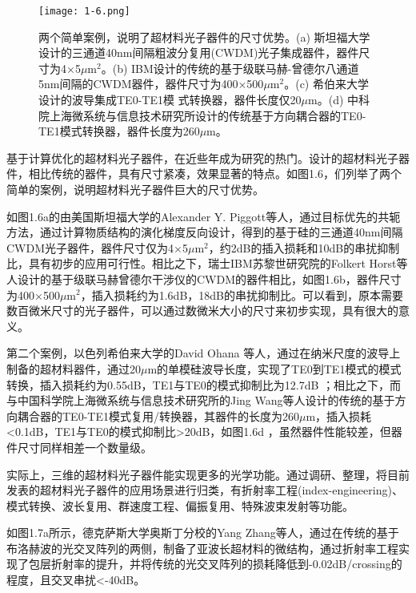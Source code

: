 \begin{figure}[!htbp]
    \centering
    \texttt{[image: 1-6.png]}
    \caption{两个简单案例，说明了超材料光子器件的尺寸优势。(a) 斯坦福大学设计的三通道40nm间隔粗波分复用(CWDM)光子集成器件，器件尺寸为4×5$\mu$m$^2$。(b) IBM设计的传统的基于级联马赫-曾德尔八通道5nm间隔的CWDM器件，器件尺寸为400×500$\mu$m$^2$。(c) 希伯来大学设计的波导集成TE0-TE1模 式转换器，器件长度仅20$\mu$m。(d) 中科院上海微系统与信息技术研究所设计的传统基于方向耦合器的TE0-TE1模式转换器，器件长度为260$\mu$m。\cite{Su2017Inverse,Folkert2013Cascaded,Ohana2016Dielectric,Jing2015Broadband}}
    \label{fig:1-6}
\end{figure}

基于计算优化的超材料光子器件，在近些年成为研究的热门。设计的超材料光子器件，相比传统的器件，具有尺寸紧凑，效果显著的特点。如图1.6，们列举了两个简单的案例，说明超材料光子器件巨大的尺寸优势。

如图1.6a的由美国斯坦福大学的Alexander Y. Piggott等人，通过目标优先的共轭方法，通过计算物质结构的演化梯度反向设计，得到的基于硅的三通道40nm间隔CWDM光子器件，器件尺寸仅为4×5$\mu$m$^2$，约2dB的插入损耗和10dB的串扰抑制比，具有初步的应用可行性\cite{Su2017Inverse}。相比之下，瑞士IBM苏黎世研究院的Folkert Horst等人设计的基于级联马赫曾德尔干涉仪的CWDM的器件相比，如图1.6b，器件尺寸为400×500$\mu$m$^2$，插入损耗约为1.6dB，18dB的串扰抑制比\cite{Folkert2013Cascaded}。可以看到，原本需要数百微米尺寸的光子器件，可以通过数微米大小的尺寸来初步实现，具有很大的意义。

第二个案例，以色列希伯来大学的David Ohana 等人，通过在纳米尺度的波导上制备的超材料器件，通过20$\mu$m的单模硅波导长度，实现了TE0到TE1模式的模式转换，插入损耗约为0.55dB，TE1与TE0的模式抑制比为12.7dB \cite{Ohana2016Dielectric}；相比之下，而与中国科学院上海微系统与信息技术研究所的Jing Wang等人设计的传统的基于方向耦合器的TE0-TE1模式复用/转换器，其器件的长度为260$\mu$m，插入损耗<0.1dB，TE1与TE0的模式抑制比>20dB，如图1.6d \cite{Jing2015Broadband}，虽然器件性能较差，但器件尺寸同样相差一个数量级。

实际上，三维的超材料光子器件能实现更多的光学功能。通过调研、整理，将目前发表的超材料光子器件的应用场景进行归类，有折射率工程(index-engineering)、模式转换、波长复用、群速度工程、偏振复用、特殊波束发射等功能。

如图1.7a所示，德克萨斯大学奥斯丁分校的Yang Zhang等人，通过在传统的基于布洛赫波的光交叉阵列的两侧，制备了亚波长超材料的微结构，通过折射率工程实现了包层折射率的提升，并将传统的光交叉阵列的损耗降低到-0.02dB/crossing的程度，且交叉串扰<-40dB。\cite{Yang2013Ultralow}

